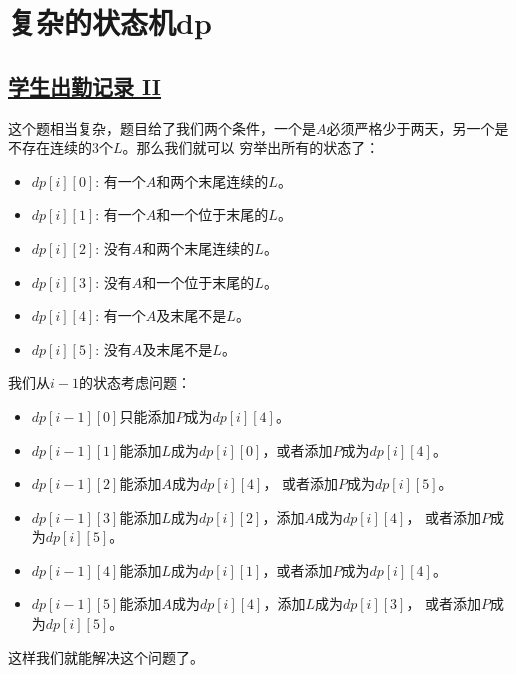 \documentclass[../../main.tex]{subfiles}
\begin{document}
\section{复杂的状态机dp}

\subsection{\href{https://leetcode.cn/problems/student-attendance-record-ii/}{学生出勤记录 II}}

这个题相当复杂，题目给了我们两个条件，一个是$A$必须严格少于两天，另一个是不存在连续的3个$L$。那么我们就可以
穷举出所有的状态了：

\begin{itemize}
  \item $dp[i][0]$: 有一个$A$和两个末尾连续的$L$。
  \item $dp[i][1]$: 有一个$A$和一个位于末尾的$L$。
  \item $dp[i][2]$: 没有$A$和两个末尾连续的$L$。
  \item $dp[i][3]$: 没有$A$和一个位于末尾的$L$。
  \item $dp[i][4]$: 有一个$A$及末尾不是$L$。
  \item $dp[i][5]$: 没有$A$及末尾不是$L$。
\end{itemize}

我们从$i - 1$的状态考虑问题：

\begin{itemize}
  \item $dp[i-1][0]$只能添加$P$成为$dp[i][4]$。
  \item $dp[i-1][1]$能添加$L$成为$dp[i][0]$，或者添加$P$成为$dp[i][4]$。
  \item $dp[i-1][2]$能添加$A$成为$dp[i][4]$， 或者添加$P$成为$dp[i][5]$。
  \item $dp[i-1][3]$能添加$L$成为$dp[i][2]$，添加$A$成为$dp[i][4]$，
  或者添加$P$成为$dp[i][5]$。
  \item $dp[i-1][4]$能添加$L$成为$dp[i][1]$，或者添加$P$成为$dp[i][4]$。
  \item $dp[i-1][5]$能添加$A$成为$dp[i][4]$，添加$L$成为$dp[i][3]$，
  或者添加$P$成为$dp[i][5]$。
\end{itemize}

这样我们就能解决这个问题了。


\end{document}
